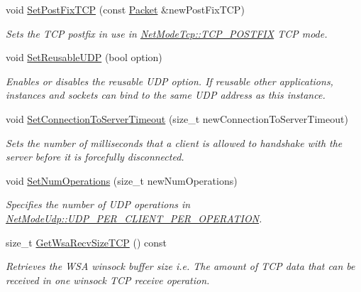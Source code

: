 \begin{DoxyCompactItemize}
void \hyperlink{class_net_instance_profile_afd7d56b3d087a5c2ea9d202a705fc2e1}{SetPostFixTCP} (const \hyperlink{class_packet}{Packet} \&newPostFixTCP)
\begin{DoxyCompactList}\small\item\em Sets the TCP postfix in use in \hyperlink{class_net_mode_a43cfa55ee6a4db66a8d7d6c27f766964abe08876125a416186e74c901f6d29ce4}{NetModeTcp::TCP\_\-POSTFIX} TCP mode. \item\end{DoxyCompactList}\item 
void \hyperlink{class_net_instance_profile_a29e19e0f4a542cc105c50ff7f7169102}{SetReusableUDP} (bool option)
\begin{DoxyCompactList}\small\item\em Enables or disables the reusable UDP option. If reusable other applications, instances and sockets can bind to the same UDP address as this instance. \item\end{DoxyCompactList}\item 
void \hyperlink{class_net_instance_profile_a66b8793bf17d64b8ef9080b2ebd03d47}{SetConnectionToServerTimeout} (size\_\-t newConnectionToServerTimeout)
\begin{DoxyCompactList}\small\item\em Sets the number of milliseconds that a client is allowed to handshake with the server before it is forcefully disconnected. \item\end{DoxyCompactList}\item 
void \hyperlink{class_net_instance_profile_a24e097e1c072358163fa00998d33e0fd}{SetNumOperations} (size\_\-t newNumOperations)
\begin{DoxyCompactList}\small\item\em Specifies the number of UDP operations in \hyperlink{class_net_mode_a43cfa55ee6a4db66a8d7d6c27f766964a947fd0828716fc0442ea546cce111c27}{NetModeUdp::UDP\_\-PER\_\-CLIENT\_\-PER\_\-OPERATION}. \item\end{DoxyCompactList}\item 
size\_\-t \hyperlink{class_net_instance_profile_a89f3243d78963e4eb890d5fda63877b9}{GetWsaRecvSizeTCP} () const 
\begin{DoxyCompactList}\small\item\em Retrieves the WSA winsock buffer size i.e. The amount of TCP data that can be received in one winsock TCP receive operation. \item\end{DoxyCompactList}\item 

\end{DoxyCompactItemize}
